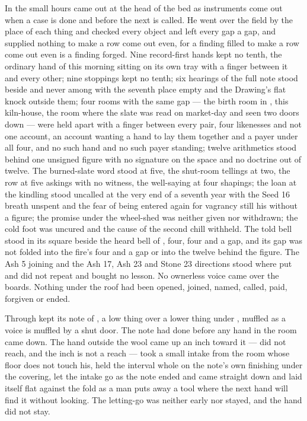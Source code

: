 In the small hours  came out at the head of the bed as instruments come out when a case is done and before the next is called. He went over the field by the place of each thing and checked every object and left every gap a gap, and supplied nothing to make a row come out even, for a finding filled to make a row come out even is a finding forged. Nine record-first hands kept no tenth, the ordinary hand of this morning sitting on its own tray with a finger between it and every other; nine stoppings kept no tenth; six hearings of the full note stood beside and never among with the seventh place empty and the Drawing's flat knock outside them; four rooms with the same gap --- the birth room in , this kiln-house, the room where the slate was read on market-day and  seen two doors down --- were held apart with a finger between every pair, four likenesses and not one account, an account wanting a hand to lay them together and a payer under all four, and no such hand and no such payer standing; twelve arithmetics stood behind one unsigned figure with no signature on the space and no doctrine out of twelve. The burned-slate word stood at five, the shut-room tellings at two, the row at five askings with no witness, the well-saying at four shapings; the loan at the kindling stood uncalled at the very end of a seventh year with the Seed 16 breath unspent and the fear of being entered again for vagrancy still his without a figure; the promise under the wheel-shed was neither given nor withdrawn; the cold foot was uncured and the cause of the second chill withheld. The told bell stood in its square beside the heard bell of , four, four and a gap, and its gap was not folded into the fire's four and a gap or into the twelve behind the figure. The Ash 5 joining and the Ash 17, Ash 23 and Stone 23 directions stood where put and did not repeat and bought no lesson. No ownerless voice came over the boards. Nothing under the roof had been opened, joined, named, called, paid, forgiven or ended.

Through   kept its note of , a low thing over a lower thing under , muffled as a voice is muffled by a shut door. The note had done before any hand in the room came down. The hand outside the wool came up an inch toward it --- did not reach, and the inch is not a reach --- took a small intake from the room whose floor does not touch his, held the interval whole on the note's own finishing under the covering, let the intake go as the note ended and came straight down and laid itself flat against the fold as a man puts away a tool where the next hand will find it without looking. The letting-go was neither early nor stayed, and the hand did not stay.


